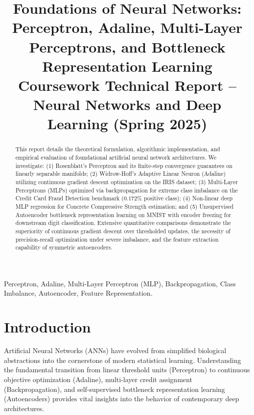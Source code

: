 \documentclass[conference]{IEEEtran}
\begin{document}
\title{Foundations of Neural Networks: Perceptron, Adaline, Multi-Layer Perceptrons, and Bottleneck Representation Learning\\
\large Coursework Technical Report -- Neural Networks and Deep Learning (Spring 2025)}

\author{
}

\maketitle

\begin{abstract}
This report details the theoretical formulation, algorithmic implementation, and empirical evaluation of foundational artificial neural network architectures. We investigate: (1) Rosenblatt's Perceptron and its finite-step convergence guarantees on linearly separable manifolds; (2) Widrow-Hoff's Adaptive Linear Neuron (Adaline) utilizing continuous gradient descent optimization on the IRIS dataset; (3) Multi-Layer Perceptrons (MLPs) optimized via backpropagation for extreme class imbalance on the Credit Card Fraud Detection benchmark ($0.172\%$ positive class); (4) Non-linear deep MLP regression for Concrete Compressive Strength estimation; and (5) Unsupervised Autoencoder bottleneck representation learning on MNIST with encoder freezing for downstream digit classification. Extensive quantitative comparisons demonstrate the superiority of continuous gradient descent over thresholded updates, the necessity of precision-recall optimization under severe imbalance, and the feature extraction capability of symmetric autoencoders.
\end{abstract}

\begin{IEEEkeywords}
Perceptron, Adaline, Multi-Layer Perceptron (MLP), Backpropagation, Class Imbalance, Autoencoder, Feature Representation.
\end{IEEEkeywords}

\section{Introduction}
Artificial Neural Networks (ANNs) have evolved from simplified biological abstractions into the cornerstone of modern statistical learning. Understanding the fundamental transition from linear threshold units (Perceptron) to continuous objective optimization (Adaline), multi-layer credit assignment (Backpropagation), and self-supervised bottleneck representation learning (Autoencoders) provides vital insights into the behavior of contemporary deep architectures.
\end{document}

